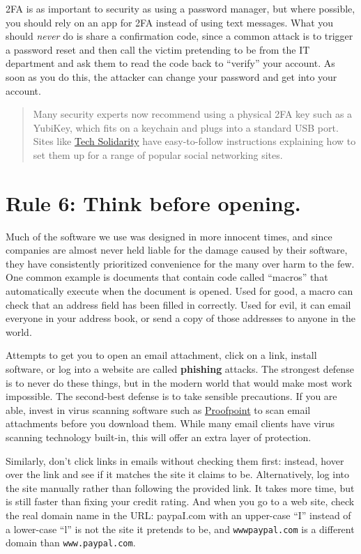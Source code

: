 \documentclass[10pt, letterpaper]{article}
\begin{document}
2FA is as important to security as using a password manager, but where possible,
you should rely on an app for 2FA instead of using text messages. What you
should \emph{never} do is share a confirmation code, since a common attack is to
trigger a password reset and then call the victim pretending to be from the IT
department and ask them to read the code back to ``verify'' your account. As
soon as you do this, the attacker can change your password and get into your
account.

\begin{quote}
  Many security experts now recommend using a physical 2FA key such as a
  YubiKey, which fits on a keychain and plugs into a standard USB port.  Sites
  like \href{https://techsolidarity.org/}{Tech Solidarity} have easy-to-follow
  instructions explaining how to set them up for a range of popular social
  networking sites.
\end{quote}

\section*{Rule 6: Think before opening.}

Much of the software we use was designed in more innocent times, and since
companies are almost never held liable for the damage caused by their software,
they have consistently prioritized convenience for the many over harm to the
few. One common example is documents that contain code called ``macros'' that
automatically execute when the document is opened. Used for good, a macro can
check that an address field has been filled in correctly. Used for evil, it can
email everyone in your address book, or send a copy of those addresses to anyone
in the world. 

Attempts to get you to open an email attachment, click on a link, install
software, or log into a website are called \textbf{phishing} attacks. The
strongest defense is to never do these things, but in the modern world that
would make most work impossible. The second-best defense is to take sensible
precautions. If you are able, invest in virus scanning software such as
\href{https://www.proofpoint.com/us/products/email-protection}{Proofpoint}
to scan email attachments before you download them. While many email clients
have virus scanning technology built-in, this will offer an extra layer of
protection.

Similarly, don't click links in emails without checking them first: instead,
hover over the link and see if it matches the site it claims to be.
Alternatively, log into the site manually rather than following the provided
link. It takes more time, but is still faster than fixing your credit rating.
And when you go to a web site, check the real domain name in the URL: paypaI.com
with an upper-case ``I'' instead of a lower-case ``l'' is not the site it
pretends to be, and \texttt{wwwpaypal.com} is a different domain than
\texttt{www.paypal.com}.
\end{document}
